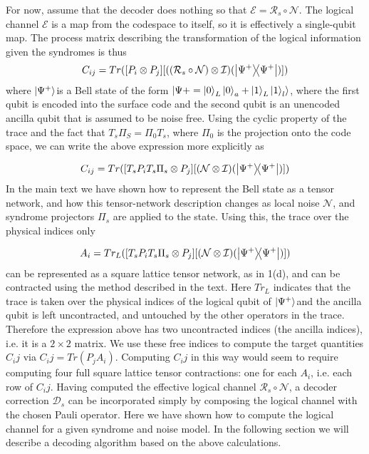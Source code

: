 For now, assume that the decoder does nothing so that \(\mathcal{E} =\mathcal{R}_s \circ \mathcal{N}\). The logical channel \(\mathcal{E}\) is a map from the codespace to itself, so it is effectively a single-qubit map. The process matrix describing the transformation of the logical information given the syndromes is thus
\begin{equation*}
    C_{ij} = Tr([P_i \otimes P_j][( (\mathcal{R}_s \circ \mathcal{N}) \otimes \mathcal{I})(\ketbra{\Psi^{+}}{\Psi^{+}})])
\end{equation*}
where \(\ket{\Psi^{+}}\)is a Bell state of the form \(\ket{\Psi{+} = \ket{0}_L \ket{0}_a + \ket{1}_L \ket{1}_l}\), where the first qubit is encoded into the surface code and the second qubit is an unencoded ancilla qubit that is assumed to be noise free. Using the cyclic property of the trace and the fact that \(T_s \Pi_S = \Pi_0 T_s\), where \(\Pi_0\) is the projection onto the code space, we can write the above expression more explicitly as

\begin{equation*}
    C_{ij} = Tr([T_s P_i T_s \Pi_s \otimes P_j][(  \mathcal{N} \otimes \mathcal{I})(\ketbra{\Psi^{+}}{\Psi^{+}})])
\end{equation*}
In the main text we have shown how to represent the Bell state as a tensor network, and how this tensor-network description changes as local noise \(\mathcal{N}\), and syndrome projectors \(\Pi_s\) are applied to the state. Using this, the trace over the physical indices only

\begin{equation*}
    A_i =  Tr_L([T_s P_i T_s \Pi_s \otimes P_j][(  \mathcal{N} \otimes \mathcal{I})(\ketbra{\Psi^{+}}{\Psi^{+}})])
\end{equation*}
can be represented as a square lattice tensor network, as in 1(d), and can be contracted using the method described in the text. Here \(Tr_L\) indicates that the trace is taken over the physical indices of the logical qubit of \(\ket{\Psi^{+}}\)and the ancilla qubit is left uncontracted, and untouched by the other operators in the trace. Therefore the expression above has two uncontracted indices (the ancilla indices), i.e. it is a \(2 \times 2\) matrix. We use these free indices to compute the target quantities \(C_ij\) via \(C_ij = Tr(P_j A_i)\). Computing \(C_ij\) in this way would seem to require computing four full square lattice tensor contractions: one for each \(A_i\), i.e. each row of \(C_ij\). Having computed the effective logical channel \(\mathcal{R}_s \circ \mathcal{N}\), a decoder correction \(\mathcal{D}_s\) can be incorporated simply by composing the logical channel with the chosen Pauli operator. Here we have shown how to compute the logical channel for a given syndrome and noise model. In the following section we will describe a decoding algorithm based on the above calculations.

